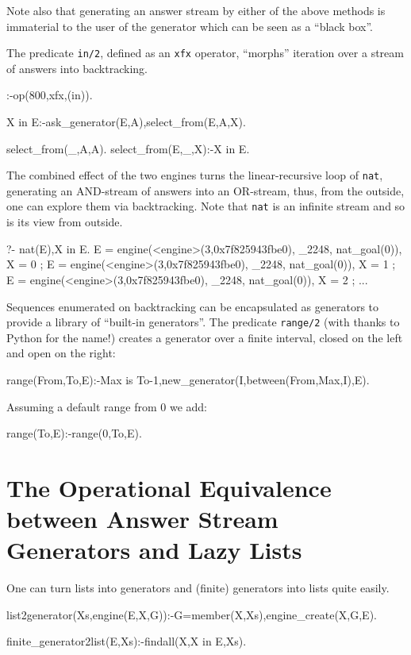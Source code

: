 \documentclass{new_tlp}
\begin{document}
Note also that generating an answer stream by either of the above methods
is immaterial to the user of the generator which can be seen as a ``black box''.

The predicate {\tt in/2}, defined as an {\tt xfx} operator,
``morphs'' iteration over  a stream of answers into backtracking.
\begin{code}
:-op(800,xfx,(in)).

X in E:-ask_generator(E,A),select_from(E,A,X).

select_from(_,A,A).
select_from(E,_,X):-X in E.
\end{code}

\BX
The combined effect of the two engines turns the linear-recursive loop of {\tt nat},
generating an AND-stream of answers into an OR-stream, thus, from the outside, one can explore them via backtracking. Note that {\tt nat} is an infinite stream and so is its
view from outside.
\begin{codex}
?- nat(E),X in E.
E = engine(<engine>(3,0x7f825943fbe0), _2248, nat_goal(0)),
X = 0 ;
E = engine(<engine>(3,0x7f825943fbe0), _2248, nat_goal(0)),
X = 1 ;
E = engine(<engine>(3,0x7f825943fbe0), _2248, nat_goal(0)),
X = 2 ;
...
\end{codex}
\EX

Sequences enumerated on backtracking can be encapsulated as generators to provide a library of ``built-in generators''.
The predicate {\tt range/2} (with thanks to Python for the name!) creates a generator over a finite interval, closed on the left and open on the right:
\begin{code}
range(From,To,E):-Max is To-1,new_generator(I,between(From,Max,I),E).
\end{code}
Assuming a  default range from 0 we add:
\begin{code}
range(To,E):-range(0,To,E).
\end{code}


\section{The Operational Equivalence between Answer Stream Generators and Lazy Lists}

One can turn lists into generators and (finite) generators into lists quite easily.
\begin{code}
list2generator(Xs,engine(E,X,G)):-G=member(X,Xs),engine_create(X,G,E).

finite_generator2list(E,Xs):-findall(X,X in E,Xs).
\end{code}
\end{document}
